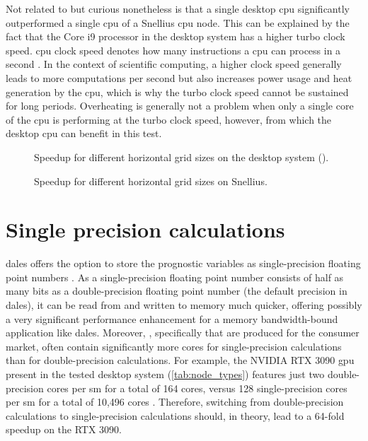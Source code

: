 Not related to  but curious nonetheless is that a single desktop \acrshort{cpu} significantly outperformed a single \acrshort{cpu} of a Snellius \acrshort{cpu} node. This can be explained by the fact that the Core i9 processor in the desktop system has a higher turbo clock speed. \acrshort{cpu} clock speed denotes how many instructions a \acrshort{cpu} can process in a second . In the context of scientific computing, a higher clock speed generally leads to more computations per second but also increases power usage and heat generation by the \acrshort{cpu}, which is why the turbo clock speed cannot be sustained for long periods. Overheating is generally not a problem when only a single core of the \acrshort{cpu} is performing at the turbo clock speed, however, from which the desktop \acrshort{cpu} can benefit in this test.

\begin{figure}[h!]
    \centering
    
    \caption{Speedup for different horizontal grid sizes on the desktop system ().}
    \label{fig:speedup_desktop}
\end{figure}

\begin{figure}[h!]
    \centering
    
    \caption{Speedup for different horizontal grid sizes on Snellius.}
    \label{fig:speedup_snellius}
\end{figure}
\section{Single precision calculations}
\acrshort{dales} offers the option to store the prognostic variables as single-precision floating point numbers \citep{janssonCloudBotanyShallow2023}. As a single-precision floating point number consists of half as many bits as a double-precision floating point number (the default precision in \acrshort{dales}), it can be read from and written to memory much quicker, offering possibly a very significant performance enhancement for a memory bandwidth-bound application like \acrshort{dales}. Moreover, , specifically  that are produced for the consumer market, often contain significantly more cores for single-precision calculations than for double-precision calculations. For example, the NVIDIA RTX 3090 \acrshort{gpu} present in the tested desktop system (\autoref{tab:node_types}) features just two double-precision cores per \acrshort{sm} for a total of 164 cores, versus 128 single-precision cores per \acrshort{sm} for a total of 10,496 cores \citep{nvidiaIntroductionNVIDIAAmpere2021}. Therefore, switching from double-precision calculations to single-precision calculations should, in theory, lead to a 64-fold speedup on the RTX 3090. 

